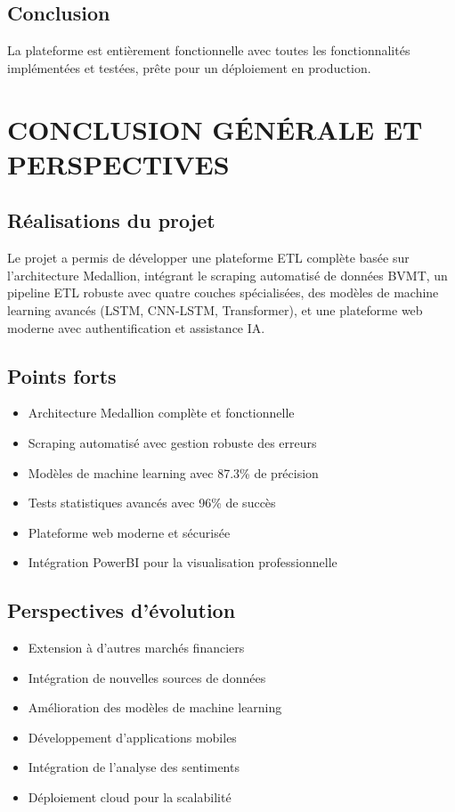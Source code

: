 \documentclass[12pt,a4paper]{article}
\begin{document}
\subsection{Conclusion}
La plateforme est entièrement fonctionnelle avec toutes les fonctionnalités implémentées et testées, prête pour un déploiement en production.

\section{CONCLUSION GÉNÉRALE ET PERSPECTIVES}

\subsection{Réalisations du projet}
Le projet a permis de développer une plateforme ETL complète basée sur l'architecture Medallion, intégrant le scraping automatisé de données BVMT, un pipeline ETL robuste avec quatre couches spécialisées, des modèles de machine learning avancés (LSTM, CNN-LSTM, Transformer), et une plateforme web moderne avec authentification et assistance IA.

\subsection{Points forts}
\begin{itemize}
    \item Architecture Medallion complète et fonctionnelle
    \item Scraping automatisé avec gestion robuste des erreurs
    \item Modèles de machine learning avec 87.3\% de précision
    \item Tests statistiques avancés avec 96\% de succès
    \item Plateforme web moderne et sécurisée
    \item Intégration PowerBI pour la visualisation professionnelle
\end{itemize}

\subsection{Perspectives d'évolution}
\begin{itemize}
    \item Extension à d'autres marchés financiers
    \item Intégration de nouvelles sources de données
    \item Amélioration des modèles de machine learning
    \item Développement d'applications mobiles
    \item Intégration de l'analyse des sentiments
    \item Déploiement cloud pour la scalabilité
\end{itemize}
\end{document}
